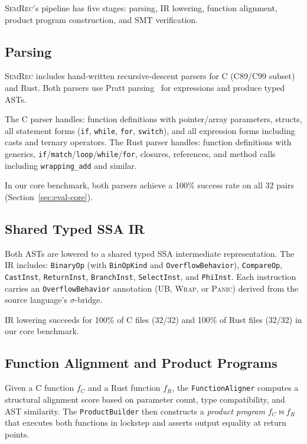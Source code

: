 \documentclass[11pt,a4paper]{article}
\begin{document}
\textsc{SemRec}'s pipeline has five stages: parsing, IR lowering,
function alignment, product program construction, and SMT verification.

\subsection{Parsing}\label{sec:parsers}

\textsc{SemRec} includes hand-written recursive-descent parsers for
C (C89/C99 subset) and Rust. Both parsers use Pratt
parsing~\cite{pratt1973top} for expressions and produce typed ASTs.

The C parser handles: function definitions with pointer/array parameters,
structs, all statement forms (\texttt{if}, \texttt{while}, \texttt{for},
\texttt{switch}), and all expression forms including casts and ternary
operators.  The Rust parser handles: function definitions with generics,
\texttt{if}/\texttt{match}/\texttt{loop}/\texttt{while}/\texttt{for},
closures, references, and method calls including \texttt{wrapping\_add}
and similar.

In our core benchmark, both parsers achieve a 100\% success rate on
all 32 pairs (Section~\ref{sec:eval-core}).

\subsection{Shared Typed SSA IR}\label{sec:ir}

Both ASTs are lowered to a shared typed SSA intermediate representation.
The IR includes: \texttt{BinaryOp} (with \texttt{BinOpKind} and
\texttt{OverflowBehavior}), \texttt{CompareOp}, \texttt{CastInst},
\texttt{ReturnInst}, \texttt{BranchInst}, \texttt{SelectInst}, and
\texttt{PhiInst}.  Each instruction carries an \texttt{OverflowBehavior}
annotation (\textsc{UB}, \textsc{Wrap}, or \textsc{Panic}) derived from
the source language's $\sigma$-bridge.

IR lowering succeeds for 100\% of C files (32/32) and 100\% of Rust
files (32/32) in our core benchmark.

\subsection{Function Alignment and Product Programs}\label{sec:product}

Given a C function $f_C$ and a Rust function $f_R$, the
\texttt{FunctionAligner} computes a structural alignment score based on
parameter count, type compatibility, and AST similarity.  The
\texttt{ProductBuilder} then constructs a \emph{product program}
$f_C \bowtie f_R$ that executes both functions in lockstep and asserts
output equality at return points.
\end{document}
